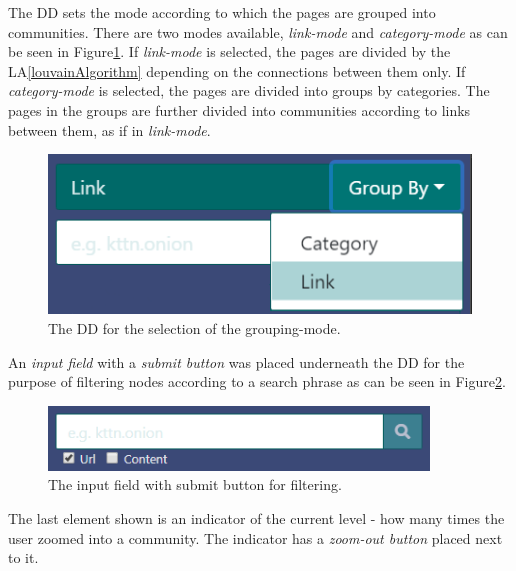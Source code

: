 The DD sets the mode according to which the pages are grouped into communities. There are two modes available, \textit{link-mode} and \textit{category-mode} as can be seen in Figure\ref{modeDropdown}. If \textit{link-mode} is selected, the pages are divided by the LA\ref{louvainAlgorithm} depending on the connections between them only. If \textit{category-mode} is selected, the pages are divided into groups by categories. The pages in the groups are further divided into communities according to links between them, as if in \textit{link-mode}. 
\begin{figure}[ht!]
  \centering
  \includegraphics{Images/mode_dropdown.png}
  \caption{The DD for the selection of the grouping-mode.}
  \label{modeDropdown}
\end{figure} 

 An \textit{input field} with a \textit{submit button} was placed underneath the DD for the purpose of filtering nodes according to a search phrase as can be seen in Figure\ref{filterNodesElement}.
\begin{figure}[ht!]
  \centering
  \includegraphics[width=0.9\textwidth]{Images/filter.png}
  \caption{The input field with submit button for filtering.}
  \label{filterNodesElement}
\end{figure}   

The last element shown is an indicator of the current level - how many times the user zoomed into a community. The indicator has a \textit{zoom-out button} placed next to it.

